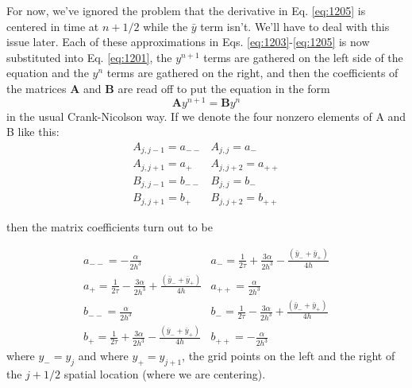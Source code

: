 For now, we\rq ve ignored the problem that the derivative in Eq. \ref{eq:1205} is centered in time at $n+1 / 2$ while the $\bar{y}$ term isn't. We\rq ll have to deal with this issue later.
Each of these approximations in Eqs. \ref{eq:1203}-\ref{eq:1205} is now substituted into Eq. \ref{eq:1201}, the $y^{n+1}$ terms are gathered on the left side of the equation and the $y^{n}$ terms are gathered on the right, and then the coefficients of the matrices $\mathbf{A}$ and $\mathbf{B}$ are read off to put the equation in the form
\begin{equation}\label{eq:1206}
\mathbf{A} y^{n+1}=\mathbf{B} y^{n}
\end{equation}
in the usual Crank-Nicolson way. If we denote the four nonzero elements of A
and B like this:
\begin{equation}\label{eq:1207}
\begin{array}{ll}
A_{j, j-1}=a_{--} & A_{j, j}=a_{-} \\
A_{j, j+1}=a_{+} & A_{j, j+2}=a_{++} \\
B_{j, j-1}=b_{--} & B_{j, j}=b_{-} \\
B_{j, j+1}=b_{+} & B_{j, j+2}=b_{++}
\end{array}
\end{equation}

then the matrix coefficients turn out to be

\begin{equation}\label{eq:1208}
\begin{array}{ll}
a_{--}=-\frac{\alpha}{2 h^{3}} & a_{-}=\frac{1}{2 \tau}+\frac{3 \alpha}{2 h^{3}}-\frac{\left(\bar{y}_{-}+\bar{y}_{+}\right)}{4 h} \\
a_{+}=\frac{1}{2 \tau}-\frac{3 \alpha}{2 h^{3}}+\frac{\left(\bar{y}_{-}+\bar{y}_{+}\right)}{4 h} & a_{++}=\frac{\alpha}{2 h^{3}} \\
b_{--}=\frac{\alpha}{2 h^{3}} & b_{-}=\frac{1}{2 \tau}-\frac{3 \alpha}{2 h^{3}}+\frac{\left(\bar{y}_{-}+\bar{y}_{+}\right)}{4 h} \\
b_{+}=\frac{1}{2 \tau}+\frac{3 \alpha}{2 h^{3}}-\frac{\left(\bar{y}_{-}+\bar{y}_{+}\right)}{4 h} & b_{++}=-\frac{\alpha}{2 h^{3}}
\end{array}
\end{equation}
where $y_{-}=y_{j}$ and where $y_{+}=y_{j+1}$, the grid points on the left and the right of the $j+1 / 2$ spatial location (where we are centering).

